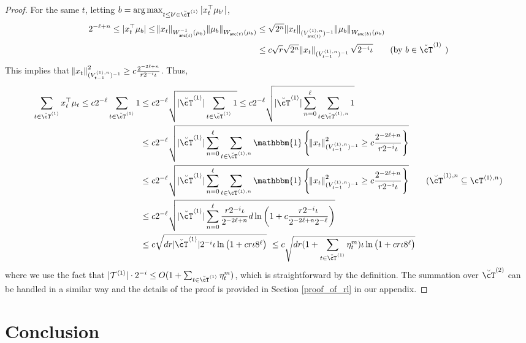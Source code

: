 \documentclass{article}
\def\one{\mathbbm{1}}
\def\brcT{\breve{\cT}}
\def\onec#1{\one\cbr{#1}}
\DeclareMathOperator{\anc}{\mathsf{anc}}
\def\la{{\langle}}
\def\ra{{\rangle}}
\begin{document}
\begin{proof}
For the same $t$, letting $b = \arg \max_{t\le b'\in \brcT^{\la1\ra} } |x_{t}^\T \mu_{b'}|$,
\begin{align*}
  2^{-\ell + n} 
  \le |x_{t}^\T \mu_{b}|
  \le \norm{x_{t}}_{W_{\anc(t)}^{-1}(\mu_{b})}  \norm{\mu_b}_{W_{\anc(t)}(\mu_b)}  
  &\le \sqrt{2^n} \norm{x_{t}}_{(V^{\la1\ra,n}_{\anc(t)})^{-1}}  \norm{\mu_{b}}_{W_{\anc(b)}(\mu_b)}  
  \\&\le c\sqrt{r} \sqrt{2^n} \norm{x_{t}}_{(V^{\la1\ra,n}_{t-1})^{-1}}  \sqrt{2^{-i}\iota}  \tag{by $b \in \brcT^{\la1\ra}$  }
\end{align*}
This implies that
$
  \norm{x_{t}}_{(V^{\la1\ra,n}_{t-1})^{-1}}^2  \ge c \fr{2^{-2\ell+n}}{r 2^{-i}\iota}
$.
Thus,
\begin{align*}
  \sum_{t\in \brcT^{\la1\ra}} x_{t}^\T\mu_{t}
  \le   c2^{-\ell} \sum_{t\in \brcT^{\la1\ra}} 1
  &\le c2^{-\ell} \sqrt{|\brcT^{\la1\ra}| \sum_{t\in \brcT^{\la1\ra}} 1}
  \le c2^{-\ell} \sqrt{|\brcT^{\la1\ra}| \sum_{n=0}^{\ell} \sum_{t\in \brcT^{\la1\ra,n}} 1}
  \\&\le c2^{-\ell} \sqrt{|\brcT^{\la1\ra}| \sum_{n=0}^{\ell} \sum_{t\in \brcT^{\la1\ra,n}} \onec{\norm{x_t }_{(V^{\la1\ra,n}_{t-1})^{-1}}^2 \ge c\fr{2^{-2\ell+n}}{r 2^{-i}\iota }} } 
  \\&\le c2^{-\ell} \sqrt{|\brcT^{\la1\ra}| \sum_{n=0}^{\ell} \sum_{t\in \cT^{\la1\ra,n}} \onec{\norm{x_t }_{(V^{\la1\ra,n}_{t-1})^{-1}}^2 \ge c\fr{2^{-2\ell+n}}{r 2^{-i}\iota }} } \tag{$\brcT^{\la1\ra,n} \subseteq \cT^{\la1\ra,n}$}
  \\&\le c2^{-\ell} \sqrt{|\brcT^{\la1\ra}| \sum_{n=0}^{\ell} \fr{r 2^{-i} \iota}{2^{-2\ell + n} } d \ln\del{ 1 + c\fr{r 2^{-i}\iota}{2^{-2\ell+n} 2^{-\ell} }  }  } 
  \\&\le c\sqrt{dr |\brcT^{\la1\ra}| 2^{-i} \iota \ln\del{ 1 + c r \iota 8^{\ell}  }  } 
    ~\le c \sqrt{dr (1 + \sum_{t \in \brcT^{\la1\ra}} \eta^m_{t} ) \iota \ln\del{ 1 + c r \iota 8^{\ell}  }  } 
\end{align*}
where we use the fact that $
    |\mathcal{T}^{\la1\ra}|\cd 2^{-i} \le O(1+\sum_{t \in \brcT^{\la1\ra}} \eta^m_{t})
$, which is straightforward by the definition. The summation over $\brcT^{(2)}$ can be handled in a similar way and the details of the proof is provided in Section \ref{proof_of_rl} in our appendix.
\end{proof}

\section{Conclusion}
\end{document}
